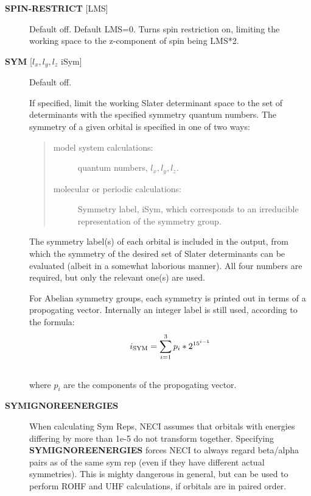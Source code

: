 \documentclass[openany,a4paper,10pt,english]{manual}
\begin{document}
\begin{description}
\item[\textbf{SPIN-RESTRICT} {[}LMS{]}] \leavevmode
Default off.  Default LMS=0.  Turns spin restriction on, limiting
the working space to the z-component of spin being LMS*2.

\item[\textbf{SYM} {[}$l_x,l_y,l_z$ iSym{]}] \leavevmode
Default off.

If specified, limit the working Slater determinant space to the set
of determinants with the specified symmetry quantum numbers. The symmetry
of a given orbital is specified in one of two ways:
\begin{quote}
\begin{description}
\item[model system calculations:]  quantum numbers, $l_x,l_y,l_z$.

\item[molecular or periodic calculations:] \leavevmode
Symmetry label, iSym, which corresponds to an irreducible
representation of the symmetry group.

\end{description}
\end{quote}

The symmetry label(s) of each orbital is included in the output,
from which the symmetry of the desired set of Slater determinants
can be evaluated (albeit in a somewhat laborious manner). All four
numbers are required, but only the relevant one(s) are used.

For Abelian symmetry groups, each symmetry is printed out in terms of
a propogating vector.  Internally an integer label is still used, according to
the formula:
\begin{gather}
\begin{split}i_{\textrm{SYM}} = \sum_{i=1}^3 p_i * 2^{15^{i-1}}\end{split}\notag\\\begin{split}\end{split}\notag
\end{gather}
where $p_i$ are the components of the propogating vector.

\item[\textbf{SYMIGNOREENERGIES}] \leavevmode
When calculating Sym Reps, NECI assumes that orbitals with energies differing
by more than 1e-5 do not transform together.
Specifying \textbf{SYMIGNOREENERGIES} forces NECI to always regard beta/alpha pairs as
of the same sym rep (even if they have different actual symmetries).  This is mighty
dangerous in general, but can be used to perform ROHF and UHF calculations, if orbitals
are in paired order.


\end{description}
\end{document}
